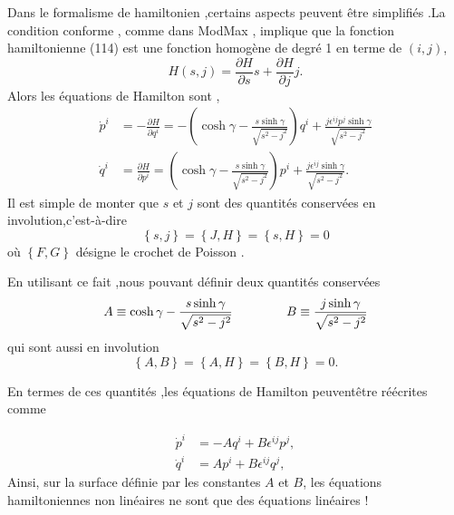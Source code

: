 \documentclass[12pt,a4paper, openany]{article}
\begin{document}
 Dans le formalisme de hamiltonien ,certains aspects peuvent \^{e}tre simplifiés .La condition conforme , comme dans ModMax , implique que la fonction hamiltonienne (114) est une fonction homogène de degré 1 en terme de $(i,j) $,
 \begin{equation}
 	H(s,j)=\frac{\partial H}{\partial s}s+\frac{\partial H}{\partial j}j .
 \end{equation}  
 Alors les équations de Hamilton sont ,
 \begin{equation}
 	\left.\begin{aligned}
  \dot{p}^{i}&=-\frac{\partial H}{\partial q^i}=-\left(\cosh{\gamma}-\frac{s\sinh{\gamma}}{\sqrt{s^2-j^2}}\right)q^i+\frac{ j\epsilon^{ij}p^j\sinh{\gamma}}{\sqrt{s^2-j^2}}\\	
 \dot{q}^{i}&=\frac{\partial H}{\partial p^i}=\left(\cosh{\gamma}-\frac{s\sinh{\gamma}}{\sqrt{s^2-j^2}}\right)p^i+\frac{	j\epsilon^{ij}\sinh{\gamma}}{\sqrt{s^2-j^2}}.
\end{aligned}\right.	
 \end{equation}
 Il est simple de monter que $s$ et $j$ sont des quantités conservées en involution,c'est-à-dire 
 \begin{equation}
 	\left\{s,j\right\}=\left\{J,H\right\}=\left\{s,H\right\}=0
 \end{equation}
 où $\left\{F,G\right\}$ désigne le crochet de Poisson .
 
 En utilisant ce fait ,nous pouvant définir deux quantités conservées 
 \begin{equation}
 	A\equiv\cosh{\gamma}-\frac{s\sinh{\gamma}}{\sqrt{s^2-j^2}} \hspace{1.5cm} B\equiv\frac{j\sinh{\gamma}}{\sqrt{s^2-j^2}}
 \end{equation}
 qui sont aussi en involution 
 \begin{equation}
 \left\{A,B\right\}=\left\{A,H\right\}=\left\{B,H\right\}=0 .	
 \end{equation}
 
 En termes de ces quantités ,les équations de Hamilton peuvent\^{e}tre réécrites comme
 
 \begin{equation}
 	\left.\begin{aligned}
 	\dot{p}^i&=-Aq^i+B\epsilon^{ij}p^j,\\
 \dot{q}^i&=Ap^i+B\epsilon^{ij}q^j,
\end{aligned}\right.
 \end{equation} 
 Ainsi, sur la surface définie par les constantes $A $ et $ B$, les équations hamiltoniennes non linéaires ne sont que des équations linéaires !
 
\end{document}
